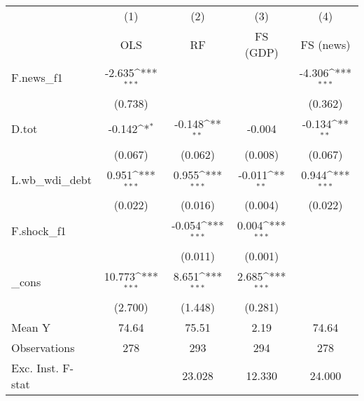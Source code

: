 {
\def\sym#1{\ifmmode^{#1}\else\(^{#1}\)\fi}
\begin{tabular}{l*{4}{c}}
\toprule
            &\multicolumn{1}{c}{(1)}&\multicolumn{1}{c}{(2)}&\multicolumn{1}{c}{(3)}&\multicolumn{1}{c}{(4)}\\
            &\multicolumn{1}{c}{OLS}&\multicolumn{1}{c}{RF}&\multicolumn{1}{c}{FS (GDP)}&\multicolumn{1}{c}{FS (news)}\\
\midrule
F.news\_f1   &      -2.635\sym{***}&                     &                     &      -4.306\sym{***}\\
            &     (0.738)         &                     &                     &     (0.362)         \\
\addlinespace
D.tot       &      -0.142\sym{*}  &      -0.148\sym{**} &      -0.004         &      -0.134\sym{**} \\
            &     (0.067)         &     (0.062)         &     (0.008)         &     (0.067)         \\
\addlinespace
L.wb\_wdi\_debt&       0.951\sym{***}&       0.955\sym{***}&      -0.011\sym{**} &       0.944\sym{***}\\
            &     (0.022)         &     (0.016)         &     (0.004)         &     (0.022)         \\
\addlinespace
F.shock\_f1  &                     &      -0.054\sym{***}&       0.004\sym{***}&                     \\
            &                     &     (0.011)         &     (0.001)         &                     \\
\addlinespace
\_cons      &      10.773\sym{***}&       8.651\sym{***}&       2.685\sym{***}&                     \\
            &     (2.700)         &     (1.448)         &     (0.281)         &                     \\
\midrule
Mean Y      &       74.64         &       75.51         &        2.19         &       74.64         \\
Observations&         278         &         293         &         294         &         278         \\
Exc. Inst. F-stat&                     &      23.028         &      12.330         &      24.000         \\
\bottomrule
\end{tabular}
}
